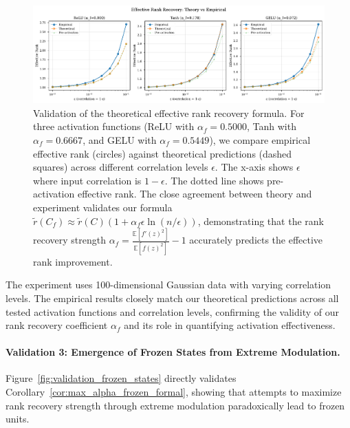 \documentclass{article}
\numberwithin{figure}{section}
\begin{document}
\begin{figure}[ht!]
    \centering
    \includegraphics[width=0.9\linewidth]{validation_effective_rank_formula.pdf}
    \caption{Validation of the theoretical effective rank recovery formula. For three activation functions (ReLU with $\alpha_f=0.5000$, Tanh with $\alpha_f=0.6667$, and GELU with $\alpha_f=0.5449$), we compare empirical effective rank (circles) against theoretical predictions (dashed squares) across different correlation levels $\epsilon$. The x-axis shows $\epsilon$ where input correlation is $1-\epsilon$. The dotted line shows pre-activation effective rank. The close agreement between theory and experiment validates our formula $\tilde{r}(C_f) \approx \tilde{r}(C)(1 + \alpha_f \epsilon \ln(n/\epsilon))$, demonstrating that the rank recovery strength $\alpha_f = \frac{\mathbb{E}[f'(z)^2]}{\mathbb{E}[f(z)^2]} - 1$ accurately predicts the effective rank improvement.}
    \label{fig:validation_effective_rank_formula}
\end{figure}

The experiment uses 100-dimensional Gaussian data with varying correlation levels. The empirical results closely match our theoretical predictions across all tested activation functions and correlation levels, confirming the validity of our rank recovery coefficient $\alpha_f$ and its role in quantifying activation effectiveness.

\paragraph{Validation 3: Emergence of Frozen States from Extreme Modulation.}
Figure~\ref{fig:validation_frozen_states} directly validates Corollary~\ref{cor:max_alpha_frozen_formal}, showing that attempts to maximize rank recovery strength through extreme modulation paradoxically lead to frozen units.
\end{document}
